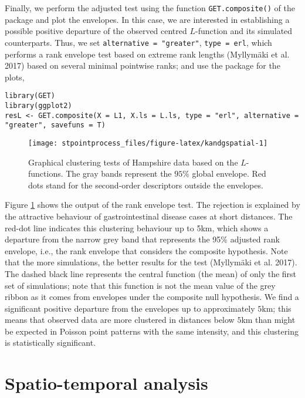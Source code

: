 Finally, we perform the adjusted test using the function \texttt{GET.composite()} of the  package and plot the envelopes. In this case, we are interested in establishing a possible positive departure of the observed centred \(L\)-function and its simulated counterparts. Thus, we set \texttt{alternative\ =\ "greater"}, \texttt{type\ =\ \textquotesingle{}erl\textquotesingle{}}, which performs a rank envelope test based on extreme rank lengths (Myllymäki et al. 2017) based on several minimal pointwise ranks; and use the  package for the plots,

\begin{verbatim}
library(GET)
library(ggplot2)
resL <- GET.composite(X = L1, X.ls = L.ls, type = "erl", alternative = "greater", savefuns = T)
\end{verbatim}

\begin{figure}

{\centering \texttt{[image: stpointprocess\_files/figure-latex/kandgspatial-1]} 

}

\caption{Graphical clustering tests of Hampshire data based on the $L$-functions. The gray bands represent the $95\%$ global envelope. Red dots stand for the second-order descriptors outside the envelopes.}\label{fig:kandgspatial}
\end{figure}

Figure \ref{fig:kandgspatial} shows the output of the rank envelope test. The rejection is explained by the attractive behaviour of gastrointestinal disease cases at short distances. The red-dot line indicates this clustering behaviour up to 5km, which shows a departure from the narrow grey band that represents the 95\% adjusted rank envelope, i.e., the rank envelope that considers the composite hypothesis. Note that the more simulations, the better results for the test (Myllymäki et al. 2017). The dashed black line represents the central function (the mean) of only the first set of simulations; note that this function is not the mean value of the grey ribbon as it comes from envelopes under the composite null hypothesis. We find a significant positive departure from the envelopes up to approximately \(5\)km; this means that observed data are more clustered in distances below \(5\)km than might be expected in Poisson point patterns with the same intensity, and this clustering is statistically significant.

\hypertarget{spatio-temporal-analysis}{%
\section{Spatio-temporal analysis}\label{spatio-temporal-analysis}}

